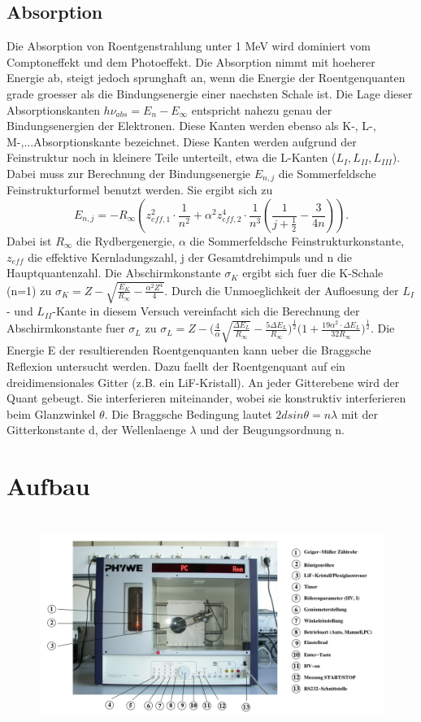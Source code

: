 \subsection{Absorption}
Die Absorption von Roentgenstrahlung unter 1 MeV wird dominiert vom Comptoneffekt und dem Photoeffekt. Die Absorption nimmt mit hoeherer Energie ab, steigt jedoch sprunghaft an, wenn die Energie der Roentgenquanten grade groesser als die Bindungsenergie einer naechsten Schale ist. Die Lage dieser Absorptionskanten $h\nu_{abs}=E_n-E_{\infty}$ entspricht nahezu genau der Bindungsenergien der Elektronen. Diese Kanten werden ebenso als K-, L-, M-,...Absorptionskante bezeichnet. Diese Kanten werden aufgrund der Feinstruktur noch in kleinere Teile unterteilt, etwa die L-Kanten ($L_I, L_{II}, L_{III}$). Dabei muss zur Berechnung der Bindungsenergie $E_{n,j}$ die Sommerfeldsche Feinstrukturformel benutzt werden. Sie ergibt sich zu 
\begin{equation*}
    E_{n,j}=-R_\infty(z^2_{eff,1}\cdot\frac{1}{n^2}+\alpha^2z^4_{eff,2}\cdot\frac{1}{n^3}(\frac{1}{j+\frac{1}{2}}-\frac{3}{4n})).
\end{equation*}
Dabei ist $R_\infty$ die Rydbergenergie, $\alpha$ die Sommerfeldsche Feinstrukturkonstante, $z_{eff}$ die effektive Kernladungszahl, j der Gesamtdrehimpuls und n die Hauptquantenzahl. Die Abschirmkonstante $\sigma_K$ ergibt sich fuer die K-Schale (n=1) zu $\sigma_K=Z-\sqrt{\frac{E_K}{R_\infty}-\frac{\alpha^2Z^4}{4}}$.
Durch die Unmoeglichkeit der Aufloesung der $L_I$- und $L_{II}$-Kante in diesem Versuch vereinfacht sich die Berechnung der Abschirmkonstante fuer $\sigma_L$ zu $\sigma_L=Z-\Bigg(\frac{4}{\alpha}\sqrt{\frac{\Delta E_L}{R_\infty}}-\frac{5\Delta E_L}{R_\infty}\Bigg)^{\frac{1}{2}}\Bigg(1+\frac{19\alpha^2\cdot\Delta E_L}{32R_\infty}\Bigg)^{\frac{1}{2}}$.
Die Energie E der resultierenden Roentgenquanten kann ueber die Braggsche Reflexion untersucht werden. Dazu faellt der Roentgenquant auf ein dreidimensionales Gitter (z.B. ein LiF-Kristall). An jeder Gitterebene wird der Quant gebeugt. Sie interferieren miteinander, wobei sie konstruktiv interferieren beim Glanzwinkel $\theta$. Die Braggsche Bedingung lautet $2dsin\theta=n\lambda$ mit der Gitterkonstante d, der Wellenlaenge $\lambda$ und der Beugungsordnung n.
\section{Aufbau}
\begin{figure}[H]
    \centering
    \captionsetup{justification=centering}
    \includegraphics[height=7cm]{"Aufbau_Roentgen.png"}
    \label{Fig:Aufbau}
\end{figure}